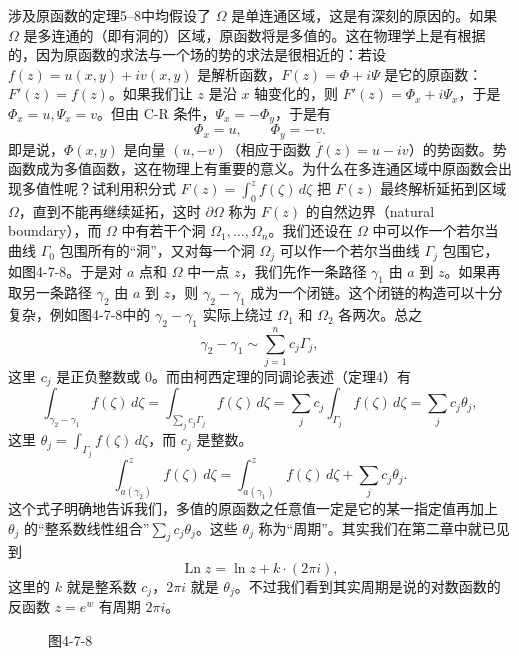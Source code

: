 涉及原函数的定理5--8中均假设了 $\Omega$ 是单连通区域，这是有深刻的原因的。如果 $\Omega$ 是多连通的（即有洞的）区域，原函数将是多值的。这在物理学上是有根据的，因为原函数的求法与一个场的势的求法是很相近的：若设 $f(z)=u(x,y)+iv(x,y)$ 是解析函数，$F(z)=\Phi+i\Psi$ 是它的原函数：$F'(z)=f(z)$。如果我们让 $z$ 是沿 $x$ 轴变化的，则 $F'(z)=\Phi_x+i\Psi_x$，于是 $\Phi_x=u,\Psi_x=v$。但由 C-R 条件，$\Psi_x=-\Phi_y$，于是有
\[
 \Phi_x=u,\qquad \Phi_y=-v.
\]
即是说，$\Phi(x,y)$ 是向量 $(u,-v)$（相应于函数 $\bar f(z)=u-iv$）的势函数。势函数成为多值函数，这在物理上有重要的意义。为什么在多连通区域中原函数会出现多值性呢？试利用积分式 $F(z)=\int_0^z f(\zeta)\,d\zeta$ 把 $F(z)$ 最终解析延拓到区域 $\Omega$，直到不能再继续延拓，这时 $\partial\Omega$ 称为 $F(z)$ 的自然边界（natural boundary），而 $\Omega$ 中有若干个洞 $\Omega_1,\ldots,\Omega_n$。我们还设在 $\Omega$ 中可以作一个若尔当曲线 $\Gamma_0$ 包围所有的“洞”，又对每一个洞 $\Omega_j$ 可以作一个若尔当曲线 $\Gamma_j$ 包围它，如图4-7-8。于是对 $a$ 点和 $\Omega$ 中一点 $z$，我们先作一条路径 $\gamma_1$ 由 $a$ 到 $z$。如果再取另一条路径 $\gamma_2$ 由 $a$ 到 $z$，则 $\gamma_2-\gamma_1$ 成为一个闭链。这个闭链的构造可以十分复杂，例如图4-7-8中的 $\gamma_2-\gamma_1$ 实际上绕过 $\Omega_1$ 和 $\Omega_2$ 各两次。总之
\[
 \gamma_2-\gamma_1\sim\sum_{j=1}^n c_j\Gamma_j,
\]
这里 $c_j$ 是正负整数或 0。而由柯西定理的同调论表述（定理4）有
\[
 \int_{\gamma_2-\gamma_1}f(\zeta)\,d\zeta
 =\int_{\sum_j c_j\Gamma_j}f(\zeta)\,d\zeta
 =\sum_j c_j\int_{\Gamma_j}f(\zeta)\,d\zeta
 =\sum_j c_j\theta_j,
\]
这里 $\theta_j=\int_{\Gamma_j}f(\zeta)\,d\zeta$，而 $c_j$ 是整数。
\[
 \int_{a(\gamma_2)}^z f(\zeta)\,d\zeta
 =\int_{a(\gamma_1)}^z f(\zeta)\,d\zeta+\sum_j c_j\theta_j.
\]
这个式子明确地告诉我们，多值的原函数之任意值一定是它的某一指定值再加上 $\theta_j$ 的“整系数线性组合”$\sum_jc_j\theta_j$。这些 $\theta_j$ 称为“周期”。其实我们在第二章中就已见到
\[
 \operatorname{Ln}z=\ln z+k\cdot(2\pi i),
\]
这里的 $k$ 就是整系数 $c_j$，$2\pi i$ 就是 $\theta_j$。不过我们看到其实周期是说的对数函数的反函数 $z=e^w$ 有周期 $2\pi i$。

\begin{figure}[htbp]
\centering
{}
\caption*{图4-7-8}
\end{figure}

